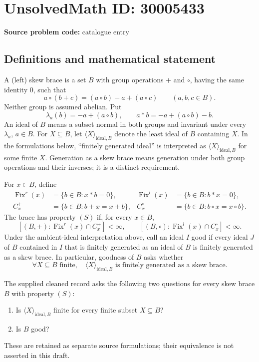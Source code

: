 \documentclass[11pt]{article}
\begin{document}
\section*{UnsolvedMath ID: 30005433}
\textbf{Source problem code:} catalogue entry
\subsection{Definitions and mathematical statement}
A (left) skew brace is a set \(B\) with group operations \(+\) and \(\circ\), having the same identity \(0\), such that
\[
a\circ(b+c)=(a\circ b)-a+(a\circ c)\qquad(a,b,c\in B).
\]
Neither group is assumed abelian. Put
\[
\lambda_a(b)=-a+(a\circ b),\qquad a*b=-a+(a\circ b)-b.
\]
An ideal of \(B\) means a subset normal in both groups and invariant under every \(\lambda_a\), \(a\in B\). For \(X\subseteq B\), let \(\langle X\rangle_{\mathrm{ideal},B}\) denote the least ideal of \(B\) containing \(X\). In the formulations below, ``finitely generated ideal'' is interpreted as \(\langle X\rangle_{\mathrm{ideal},B}\) for some finite \(X\). Generation as a skew brace means generation under both group operations and their inverses; it is a distinct requirement.

For \(x\in B\), define
\[
\begin{aligned}
\operatorname{Fix}^{r}(x)&=\{b\in B:x*b=0\},&
\operatorname{Fix}^{l}(x)&=\{b\in B:b*x=0\},\\
C_x^+&=\{b\in B:b+x=x+b\},&
C_x^\circ&=\{b\in B:b\circ x=x\circ b\}.
\end{aligned}
\]
The brace has property \((S)\) if, for every \(x\in B\),
\[
[(B,+):\operatorname{Fix}^{r}(x)\cap C_x^+]<\infty,
\qquad
[(B,\circ):\operatorname{Fix}^{l}(x)\cap C_x^\circ]<\infty.
\]
Under the ambient-ideal interpretation above, call an ideal \(I\) good if every ideal \(J\) of \(B\) contained in \(I\) that is finitely generated as an ideal of \(B\) is finitely generated as a skew brace. In particular, goodness of \(B\) asks whether
\[
\forall X\subseteq B\text{ finite},\quad
\langle X\rangle_{\mathrm{ideal},B}
\text{ is finitely generated as a skew brace}.
\]

The supplied cleaned record asks the following two questions for every skew brace \(B\) with property \((S)\):
\begin{enumerate}
\item Is \(\langle X\rangle_{\mathrm{ideal},B}\) finite for every finite subset \(X\subseteq B\)?
\item Is \(B\) good?
\end{enumerate}
These are retained as separate source formulations; their equivalence is not asserted in this draft.
\end{document}
